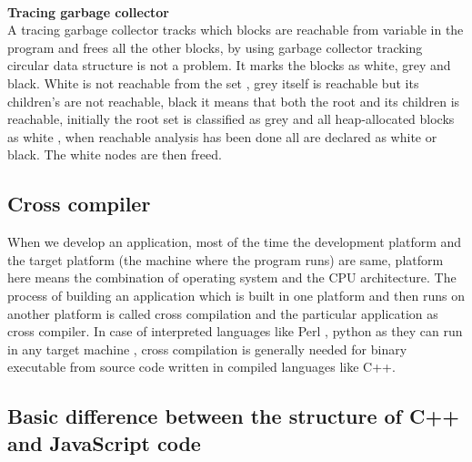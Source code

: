 \documentclass[23pt]{article}
\begin{document}
{\\ \textbf{Tracing garbage collector} \\
A tracing garbage collector tracks which blocks are reachable from variable in the program and frees all the other blocks, by using garbage collector tracking circular data structure is not a problem. It marks the blocks as white, grey and black. White is not reachable from the set , grey itself is reachable but its children’s are not reachable, black it means that both the root and its children is reachable, initially the root set is classified as grey and all heap-allocated blocks as white , when reachable analysis has been done all are declared as white or black. The white nodes are then freed. \par}

\subsection{Cross compiler}

{\Large When we develop an application, most of the time the development platform and the target platform (the machine where the program runs) are same, platform here means the combination of operating system and the CPU architecture. The process of building an application which is built in one platform and then runs on another platform is called cross compilation and the particular application as cross compiler. In case of interpreted languages like Perl , python as they can run in any target machine , cross compilation is generally needed for binary executable from source code written in compiled languages like C++. \par}

\subsection{Basic difference between the structure of C++ and JavaScript code}
\end{document}
